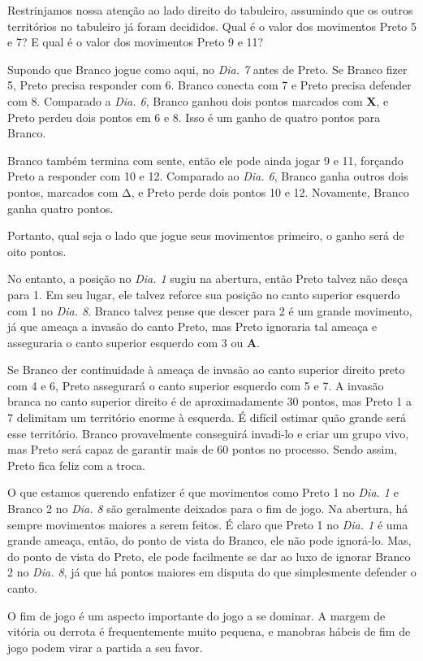 Restrinjamos nossa atenção ao lado direito do tabuleiro, assumindo que os outros territórios no tabuleiro já foram decididos. Qual é o valor dos movimentos Preto 5 e 7? E qual é o valor dos movimentos Preto 9 e 11?

Supondo que Branco jogue como aqui, no \emph{Dia. 7} antes de Preto. Se Branco fizer 5, Preto precisa responder com 6. Branco conecta com 7 e Preto precisa defender com 8. Comparado a \emph{Dia. 6}, Branco ganhou dois pontos marcados com \textbf{X}, e Preto perdeu dois pontos em 6 e 8. Isso é um ganho de quatro pontos para Branco.

Branco também termina com sente, então ele pode ainda jogar 9 e 11, forçando Preto a responder com 10 e 12. Comparado ao \emph{Dia. 6}, Branco ganha outros dois pontos, marcados com \(\increment\), e Preto perde dois pontos 10 e 12. Novamente, Branco ganha quatro pontos.

Portanto, qual seja o lado que jogue seus movimentos primeiro, o ganho será de oito pontos.

No entanto, a posição no \emph{Dia. 1} sugiu na abertura, então Preto talvez não desça para 1. Em seu lugar, ele talvez reforce sua posição no canto superior esquerdo com 1 no \emph{Dia. 8}. Branco talvez pense que descer para 2 é um grande movimento, já que ameaça a invasão do canto Preto, mas Preto ignoraria  tal ameaça e asseguraria o canto superior esquerdo com 3 ou \textbf{A}.

Se Branco der continuidade à ameaça de invasão ao canto superior direito preto com 4 e 6, Preto assegurará o canto superior esquerdo com 5 e 7. A invasão branca no canto superior direito é de aproximadamente 30 pontos, mas Preto 1 a 7 delimitam um território enorme à esquerda. É difícil estimar quão grande será esse território. Branco provavelmente conseguirá invadi-lo e criar um grupo vivo, mas Preto será capaz de garantir mais de 60 pontos no processo. Sendo assim, Preto fica feliz com a troca.

O que estamos querendo enfatizer é que movimentos como Preto 1 no \emph{Dia. 1} e Branco 2 no \emph{Dia. 8} são geralmente deixados para o fim de jogo. Na abertura, há sempre movimentos maiores a serem feitos. É claro que Preto 1 no \emph{Dia. 1} é uma grande ameaça, então, do ponto de vista do Branco, ele não pode ignorá-lo. Mas, do ponto de vista do Preto, ele pode facilmente se dar ao luxo de ignorar Branco 2 no \emph{Dia. 8}, já que há pontos maiores em disputa do que simplesmente defender o canto.

O fim de jogo é um aspecto importante do jogo a se dominar. A margem de vitória ou derrota é frequentemente muito pequena, e manobras hábeis de fim de jogo podem virar a partida a seu favor.

